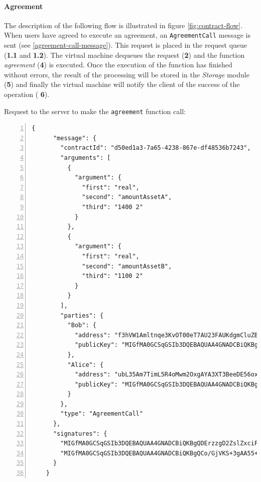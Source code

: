 \paragraph{Agreement}

The description of the following flow is illustrated in figure \ref{fig:contract-flow}. When users have 
agreed to execute an agreement, an \verb|AgreementCall| message is sent (see 
\ref{agreement-call-message}). This request is placed in the request queue (\textbf{1.1} and 
\textbf{1.2}). The virtual machine dequeues the request (\textbf{2}) and the function \textit{agreement} 
(\textbf{4}) is executed. Once the execution of the function has finished without errors, the result of 
the processing will be stored in the \textit{Storage} module (\textbf{5}) and finally the virtual machine 
will notify the client of the success of the operation (\textbf{ 6}).

Request to the server to make the \verb|agreement| function call:
{
  \small
  \begin{Verbatim}[numbers=left,xleftmargin=1cm,firstnumber=1,breaklines=true,breakanywhere=true,tabsize=2]
    {
      "message": {
        "contractId": "d50ed1a3-7a65-4238-867e-df48536b7243",
        "arguments": [
          {
            "argument": {
              "first": "real",
              "second": "amountAssetA",
              "third": "1400 2"
            }
          },
          {
            "argument": {
              "first": "real",
              "second": "amountAssetB",
              "third": "1100 2"
            }
          }
        ],
        "parties": {
          "Bob": {
            "address": "f3hVW1Amltnqe3KvOT00eT7AU23FAUKdgmCluZB+nss=",
            "publicKey": "MIGfMA0GCSqGSIb3DQEBAQUAA4GNADCBiQKBgQDErzzgD2ZslZxciFAiX3/ot7lrkZDw4148jFZrsDZPE6CVs9xXFSHGgy/mFvIFLXhnChO6Nyd2be3lbgeavLMCMVUiTStXr117Km17keWpb3sItkKKsLFBOcIIU8XXowI/OhzQN2XPZYESHgjdQ5vwEj2YyueiS7WKP94YWz/pswIDAQAB"
          },
          "Alice": {
            "address": "ubL35Am7TimL5R4oMwm2OxgAYA3XT3BeeDE56oxqdLc=",
            "publicKey": "MIGfMA0GCSqGSIb3DQEBAQUAA4GNADCBiQKBgQCo/GjVKS+3gAA55+kko41yINdOcCLQMSBQyuTTkKHE1mhu/TgOpivM0wLPsSga8hQMr3+v3aR0IF/vfCRf6SdiXmWx/jflmEXtnT6fkGcnV6dGNUpHWXSpwUIDt0N88jfnEqekx4S+KDCKg99sGEeHeT65fKS8lB0gjHMt9AOriwIDAQAB"
          }
        },
        "type": "AgreementCall"
      },
      "signatures": {
        "MIGfMA0GCSqGSIb3DQEBAQUAA4GNADCBiQKBgQDErzzgD2ZslZxciFAiX3/ot7lrkZDw4148jFZrsDZPE6CVs9xXFSHGgy/mFvIFLXhnChO6Nyd2be3lbgeavLMCMVUiTStXr117Km17keWpb3sItkKKsLFBOcIIU8XXowI/OhzQN2XPZYESHgjdQ5vwEj2YyueiS7WKP94YWz/pswIDAQAB": "crMKGFVc5QYmYfbyxDaqhXEi0/GRO+j2OD8HtBbysVm1/+2D+nFATAOvm+LbDtLMMBHxTE8a4JHzMN1DZ1uokkwHKyv80/IVMLwjZi6RFl1Jk7jUpUq6nBCPfqfa7u2IKtzv0joJXR/8BNyN3u6+PReS+4N530+ESN3W2P3tIFk=",
        "MIGfMA0GCSqGSIb3DQEBAQUAA4GNADCBiQKBgQCo/GjVKS+3gAA55+kko41yINdOcCLQMSBQyuTTkKHE1mhu/TgOpivM0wLPsSga8hQMr3+v3aR0IF/vfCRf6SdiXmWx/jflmEXtnT6fkGcnV6dGNUpHWXSpwUIDt0N88jfnEqekx4S+KDCKg99sGEeHeT65fKS8lB0gjHMt9AOriwIDAQAB": "OK9fuuEHTIV5gjtghgvFqsJZI98Ip7IYXvph0J79kTwfRVvJnH5mX9Rs/lDUWnznOmY3HTADwn4QgzMQgdu+qAfixoyJWvZJZ8XjNo/N1YI3nnaaXhvkpR80SHhxqhFLfET6rAx5qXpziOZS7NfcIasn6Lj35hbQCfcjKvxf76w="
      }
    }
  \end{Verbatim}
}


